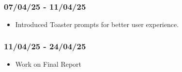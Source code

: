 \documentclass[]{final_report}
\begin{document}
\subsubsection*{07/04/25 - 11/04/25}
\begin{itemize}
    \item Introduced Toaster prompts for better user experience.
\end{itemize}

\subsubsection*{11/04/25 - 24/04/25}
\begin{itemize}
    \item Work on Final Report
\end{itemize}
\end{document}
